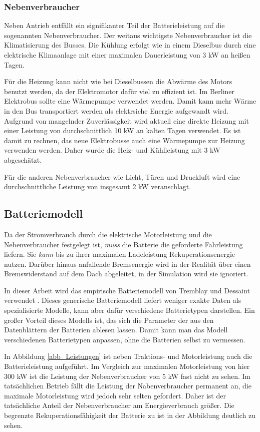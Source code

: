 \subsubsection{Nebenverbraucher}
Neben Antrieb entfällt ein signifikanter Teil der Batterieleistung auf die sogenannten Nebenverbraucher. Der weitaus wichtigste Nebenverbraucher ist die Klimatisierung des Busses. Die Kühlung erfolgt wie in einem Dieselbus durch eine elektrische Klimaanlage mit einer maximalen Dauerleistung von 3 kW an heißen Tagen.

Für die Heizung kann nicht wie bei Dieselbussen die Abwärme des Motors benutzt werden, da der Elektromotor dafür viel zu effizient ist. Im Berliner Elektrobus sollte eine Wärmepumpe verwendet werden. Damit kann mehr Wärme in den Bus transportiert werden als elektrsiche Energie aufgewandt wird. Aufgrund von mangelnder Zuverlässigkeit wird aktuell eine direkte Heizung mit einer Leistung von durchschnittlich 10 kW an kalten Tagen verwendet. Es ist damit zu rechnen, das neue Elektrobusse auch eine Wärmepumpe zur Heizung verwenden werden. Daher wurde die Heiz- und Kühlleistung mit 3 kW abgeschätzt.

Für die anderen Nebenverbraucher wie Licht, Türen und Druckluft wird eine durchschnittliche Leistung von insgesamt 2 kW veranschlagt.

\subsection{Batteriemodell}
Da der Stromverbrauch durch die elektrische Motorleistung und die Nebenverbraucher festgelegt ist, \emph{muss} die Batterie die geforderte Fahrleistung liefern. Sie \emph{kann} bis zu ihrer maximalen Ladeleistung Rekuperationsenergie nutzen. Darüber hinaus anfallende Bremsenergie wird in der Realität über einen Bremswiderstand auf dem Dach abgeleitet, in der Simulation wird sie ignoriert.

In dieser Arbeit wird das empirische Batteriemodell von Tremblay und Dessaint verwendet \cite{tremblay2009experimental}. Dieses generische Batteriemodell liefert weniger exakte Daten als spezialisierte Modelle, kann aber dafür verschiedene Batterietypen darstellen. Ein großer Vorteil dieses Modells ist, das sich die Parameter der aus den Datenblättern der Batterien ablesen lassen. Damit kann man das Modell verschiedenen Batterietypen anpassen, ohne die Batterien selbst zu vermessen.

In Abbildung \ref{abb_Leistungen} ist neben Traktions- und Motorleistung auch die Batterieleistung aufgeführt. Im Vergleich zur maximalen Motorleistung von hier 300 kW ist die Leistung der Nebenverbraucher von 5 kW fast nicht zu sehen. Im tatsächlichen Betrieb fällt die Leistung der Nabenverbraucher permanent an, die maximale Motorleistung wird jedoch sehr selten gefordert. Daher ist der tatsächliche Anteil der Nebenverbraucher am Energieverbrauch größer. Die begrenzte Rekuperationsfähigkeit der Batterie zu ist in der Abbildung deutlich zu sehen.

